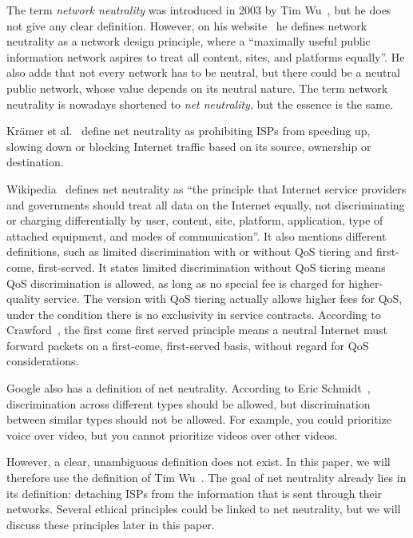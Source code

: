 
The term \emph{network neutrality} was introduced in 2003 by Tim Wu~\cite{wu2003network}, but he does not give any clear definition. However, on his website~\cite{wu2014network} he defines network neutrality as a network design principle, where a ``maximally useful public information network aspires to treat all content, sites, and platforms equally''. He also adds that not every network has to be neutral, but there could be a neutral public network, whose value depends on its neutral nature. The term network neutrality is nowadays shortened to \emph{net neutrality}, but the essence is the same.

Kr\"amer et al.~\cite{kramer2013net} define net neutrality as prohibiting \acp{ISP} from speeding up, slowing down or blocking Internet traffic based on its source, ownership or destination.

Wikipedia~\cite{wikipedia2014net} defines net neutrality as ``the principle that Internet service providers and governments should treat all data on the Internet equally, not discriminating or charging differentially by user, content, site, platform, application, type of attached equipment, and modes of communication''. It also mentions different definitions, such as limited discrimination with or without \ac{QoS} tiering and first-come, first-served. It states limited discrimination without \ac{QoS} tiering means \ac{QoS} discrimination is allowed, as long as no special fee is charged for higher-quality service. The version with \ac{QoS} tiering actually allows higher fees for \ac{QoS}, under the condition there is no exclusivity in service contracts. According to Crawford~\cite{uhls2007digital}, the first come first served principle means a neutral Internet must forward packets on a first-come, first-served basis, without regard for \ac{QoS} considerations.

Google also has a definition of net neutrality. According to Eric Schmidt~\cite{goldman2010why}, discrimination across different types should be allowed, but discrimination between similar types should not be allowed. For example, you could prioritize voice over video, but you cannot prioritize videos over other videos.

However, a clear, unambiguous definition does not exist. In this paper, we will therefore use the definition of Tim Wu~\cite{wu2014network}.
The goal of net neutrality already lies in its definition: detaching \acp{ISP} from the information that is sent through their networks.
Several ethical principles could be linked to net neutrality, but we will discuss these principles later in this paper.

